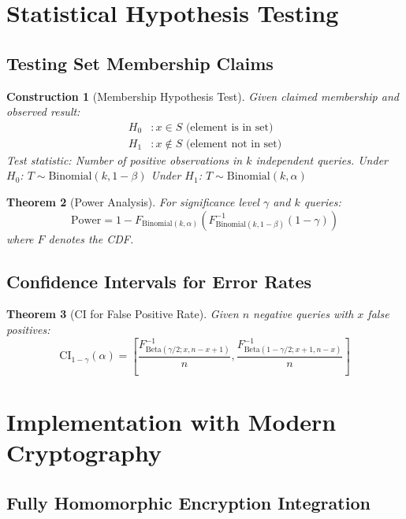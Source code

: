 \documentclass[11pt,final]{article}
\newcommand{\bindist}{\text{Binomial}}
\newtheorem{theorem}{Theorem}[section]
\newtheorem{construction}[theorem]{Construction}
\begin{document}
\section{Statistical Hypothesis Testing}

\subsection{Testing Set Membership Claims}

\begin{construction}[Membership Hypothesis Test]
Given claimed membership and observed result:
\begin{align}
H_0&: x \in S \text{ (element is in set)} \\
H_1&: x \notin S \text{ (element not in set)}
\end{align}
Test statistic: Number of positive observations in $k$ independent queries.
Under $H_0$: $T \sim \bindist(k, 1-\beta)$
Under $H_1$: $T \sim \bindist(k, \alpha)$
\end{construction}

\begin{theorem}[Power Analysis]
For significance level $\gamma$ and $k$ queries:
\begin{equation}
\text{Power} = 1 - F_{\bindist(k,\alpha)}(F^{-1}_{\bindist(k,1-\beta)}(1-\gamma))
\end{equation}
where $F$ denotes the CDF.
\end{theorem}

\subsection{Confidence Intervals for Error Rates}

\begin{theorem}[CI for False Positive Rate]
Given $n$ negative queries with $x$ false positives:
\begin{equation}
\text{CI}_{1-\gamma}(\alpha) = \left[\frac{F^{-1}_{\text{Beta}(\gamma/2; x, n-x+1)}}{n}, \frac{F^{-1}_{\text{Beta}(1-\gamma/2; x+1, n-x)}}{n}\right]
\end{equation}
\end{theorem}

\section{Implementation with Modern Cryptography}

\subsection{Fully Homomorphic Encryption Integration}
\end{document}
